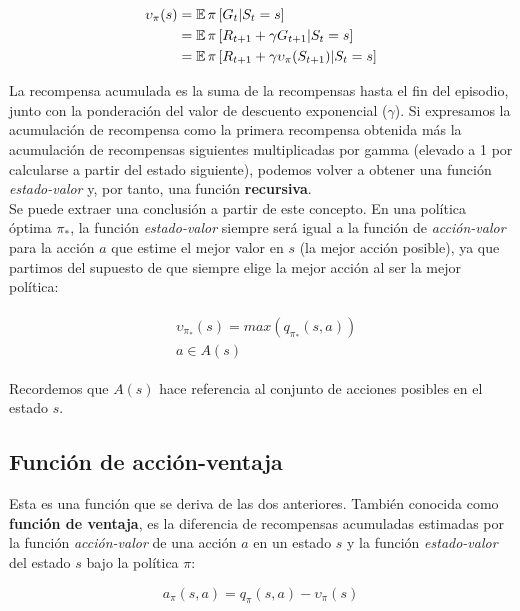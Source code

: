 \documentclass[11pt,fleqn]{book} %
\begin{document}
\begin{align}
\begin{split}
\upsilon_\pi(s)&=\operatorname*{\mathbb{E}}\pi\left[G_t|S_t=s\right] \\
&= \operatorname*{\mathbb{E}}\pi\left[R_{t+1}+\gamma G_{t+1}|S_t=s\right]\\
&= \operatorname*{\mathbb{E}}\pi\left[R_{t+1}+\gamma \upsilon_\pi(S_{t+1})|S_t=s\right]
\end{split}
\end{align} 

La recompensa acumulada es la suma de la recompensas hasta el fin del episodio, junto con la ponderación del valor de descuento exponencial ($\gamma$). Si expresamos la acumulación de recompensa como la primera recompensa obtenida más la acumulación de recompensas siguientes multiplicadas por gamma (elevado a 1 por calcularse a partir del estado siguiente), podemos volver a obtener una función \textit{estado-valor} y, por tanto, una función \textbf{recursiva}.\\

Se puede extraer una conclusión a partir de este concepto. En una política óptima $\pi_*$, la función \textit{estado-valor} siempre será igual a la función de \textit{acción-valor} para la acción $a$ que estime el mejor valor en $s$ (la mejor acción posible), ya que partimos del supuesto de que siempre elige la mejor acción al ser la mejor política:

\begin{align}
\begin{split}
&\upsilon_{\pi_*}(s) = max(q_{\pi_*}(s,a))\\
&a \in A(s)
\end{split}
\end{align}

Recordemos que $A(s)$ hace referencia al conjunto de acciones posibles en el estado $s$. 


\subsection{Función de acción-ventaja}\label{sec:ventaja}

Esta es una función que se deriva de las dos anteriores. También conocida como \textbf{función de ventaja}, es la diferencia de recompensas acumuladas estimadas por la función \textit{acción-valor} de una acción $a$ en un estado $s$ y la función \textit{estado-valor} del estado $s$ bajo la política $\pi$:

\begin{equation}
a_\pi(s,a)=q_\pi(s,a)-\upsilon_\pi(s)
\end{equation}
\end{document}
